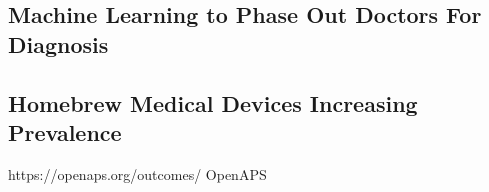 \documentclass{article}
\begin{document}

\subsection{Machine Learning to Phase Out Doctors For Diagnosis}

\cite{topol2015patient}

\subsection{Homebrew Medical Devices Increasing Prevalence}


\cite{carson2010homebrew}



\cite{lausted2004posam}




https://openaps.org/outcomes/
OpenAPS
\cite{lewis2015introducing}





\cite{OpenSourceHealthcare}
\cite{carsonopensource}
\cite{MarketsNotCapitalism}
\cite{carsonhealthcare}



\end{document}
